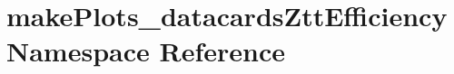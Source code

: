 \hypertarget{namespacemakePlots__datacardsZttEfficiency}{
\section{makePlots\_\-datacardsZttEfficiency Namespace Reference}
\label{namespacemakePlots__datacardsZttEfficiency}
}
